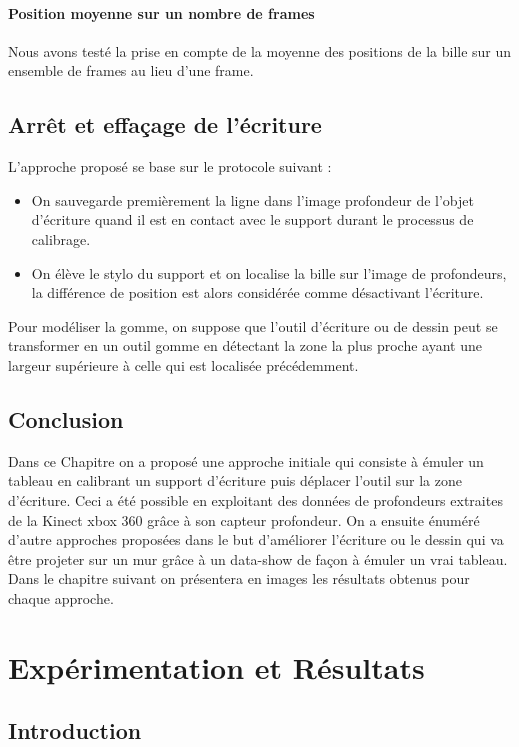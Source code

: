 \documentclass[12pt,a4paper,oneside]{book}
\begin{document}
	\subsubsection{Position moyenne sur un nombre de frames}
	Nous avons testé la prise en compte de la moyenne des positions de la bille sur un ensemble de frames au lieu d'une frame. 
	
	\section{Arrêt et effaçage de l'écriture}
	L'approche proposé se base sur le protocole suivant :
	
	\begin{itemize}
		\item 	On sauvegarde premièrement la ligne dans l'image  profondeur  de l'objet d'écriture quand il est en contact avec le support durant le processus de calibrage.
		\item  On élève le stylo du support et on localise la bille sur l'image de profondeurs, la différence de position est alors considérée comme désactivant l'écriture.		
	\end{itemize}
	
	Pour modéliser la gomme, on suppose que l'outil d'écriture ou de dessin peut se transformer en un outil gomme en détectant la zone la plus proche ayant une largeur supérieure à celle qui est localisée précédemment.
	
	\section{Conclusion}
	Dans ce Chapitre on a proposé une approche initiale qui consiste à émuler un tableau en calibrant un support d'écriture puis déplacer l'outil sur la zone d'écriture. Ceci a été possible en exploitant des données de profondeurs extraites de la Kinect xbox 360 grâce à son capteur profondeur. On a ensuite énuméré d'autre approches proposées dans le but d'améliorer l'écriture ou le dessin qui va  être projeter sur un mur grâce à un data-show de façon à émuler un vrai tableau. Dans le chapitre suivant on présentera en images les résultats obtenus pour chaque approche.
	
	
	
	
	\chapter{Expérimentation et Résultats}
	
	\section{Introduction}
	
\end{document}
